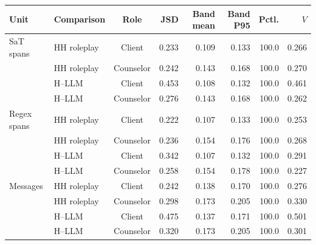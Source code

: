 \begin{tabular}{llcrrrrr}
\toprule
Unit & Comparison & Role & JSD & Band mean & Band P95 & Pctl. & $V$ \\
\midrule
SaT spans & HH roleplay & Client & 0.233 & 0.109 & 0.133 & 100.0 & 0.266 \\
 & HH roleplay & Counselor & 0.242 & 0.143 & 0.168 & 100.0 & 0.270 \\
 & H--LLM & Client & 0.453 & 0.108 & 0.132 & 100.0 & 0.461 \\
 & H--LLM & Counselor & 0.276 & 0.143 & 0.168 & 100.0 & 0.262 \\
Regex spans & HH roleplay & Client & 0.222 & 0.107 & 0.133 & 100.0 & 0.253 \\
 & HH roleplay & Counselor & 0.236 & 0.154 & 0.176 & 100.0 & 0.268 \\
 & H--LLM & Client & 0.342 & 0.107 & 0.132 & 100.0 & 0.291 \\
 & H--LLM & Counselor & 0.258 & 0.154 & 0.178 & 100.0 & 0.227 \\
Messages & HH roleplay & Client & 0.242 & 0.138 & 0.170 & 100.0 & 0.276 \\
 & HH roleplay & Counselor & 0.298 & 0.173 & 0.205 & 100.0 & 0.330 \\
 & H--LLM & Client & 0.475 & 0.137 & 0.171 & 100.0 & 0.501 \\
 & H--LLM & Counselor & 0.320 & 0.173 & 0.205 & 100.0 & 0.301 \\
\bottomrule
\end{tabular}
